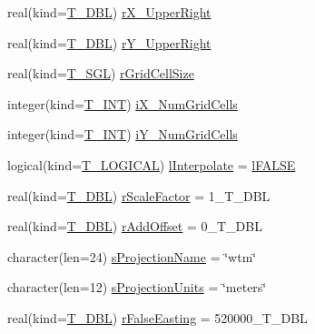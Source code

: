 \begin{DoxyCompactItemize}
\item 
real(kind=\hyperlink{namespacetest_af379b935264d350d76bf75331181e241}{T\_\-DBL}) \hyperlink{typetest_1_1_t___n_e_t_c_d_f___f_i_l_e_a494e23d00a4799d39a314f927ce58e03}{rX\_\-UpperRight}
\item 
real(kind=\hyperlink{namespacetest_af379b935264d350d76bf75331181e241}{T\_\-DBL}) \hyperlink{typetest_1_1_t___n_e_t_c_d_f___f_i_l_e_a1a157d33af50d8436033673c12f6cb66}{rY\_\-UpperRight}
\item 
real(kind=\hyperlink{namespacetest_a04d8b9090502de3a00046fe904bc3d99}{T\_\-SGL}) \hyperlink{typetest_1_1_t___n_e_t_c_d_f___f_i_l_e_a9e9f182e86a102794cbb1873facadbf3}{rGridCellSize}
\item 
integer(kind=\hyperlink{namespacetest_a6f91ebd89b58cfcc5da99faed9385c1e}{T\_\-INT}) \hyperlink{typetest_1_1_t___n_e_t_c_d_f___f_i_l_e_a2e8fa831b376d9295f1a192e123244c2}{iX\_\-NumGridCells}
\item 
integer(kind=\hyperlink{namespacetest_a6f91ebd89b58cfcc5da99faed9385c1e}{T\_\-INT}) \hyperlink{typetest_1_1_t___n_e_t_c_d_f___f_i_l_e_acf7548b69430f466664da7a8e41b790a}{iY\_\-NumGridCells}
\item 
logical(kind=\hyperlink{namespacetest_acdeac586276a7d1d394fb5eddc77fc3d}{T\_\-LOGICAL}) \hyperlink{typetest_1_1_t___n_e_t_c_d_f___f_i_l_e_ad0ad77a4e58dd916eaf322b5dd4429c0}{lInterpolate} = \hyperlink{namespacetest_ad44869e0204417021792170cd610ee25}{lFALSE}
\item 
real(kind=\hyperlink{namespacetest_af379b935264d350d76bf75331181e241}{T\_\-DBL}) \hyperlink{typetest_1_1_t___n_e_t_c_d_f___f_i_l_e_aea57fe5655c5b890069d8de257478b08}{rScaleFactor} = 1\_\-T\_\-DBL
\item 
real(kind=\hyperlink{namespacetest_af379b935264d350d76bf75331181e241}{T\_\-DBL}) \hyperlink{typetest_1_1_t___n_e_t_c_d_f___f_i_l_e_a69bbdef63dab58a45d70ab3e374b4e5d}{rAddOffset} = 0\_\-T\_\-DBL
\item 
character(len=24) \hyperlink{typetest_1_1_t___n_e_t_c_d_f___f_i_l_e_ad9db4ce3ff5b9f14b4284581f8fb72af}{sProjectionName} = \char`\"{}wtm\char`\"{}
\item 
character(len=12) \hyperlink{typetest_1_1_t___n_e_t_c_d_f___f_i_l_e_a88495338566a424a7714af57cc05975b}{sProjectionUnits} = \char`\"{}meters\char`\"{}
\item 
real(kind=\hyperlink{namespacetest_af379b935264d350d76bf75331181e241}{T\_\-DBL}) \hyperlink{typetest_1_1_t___n_e_t_c_d_f___f_i_l_e_afd612f182274d620271deea5cbd9abdf}{rFalseEasting} = 520000\_\-T\_\-DBL
\item 

\end{DoxyCompactItemize}
